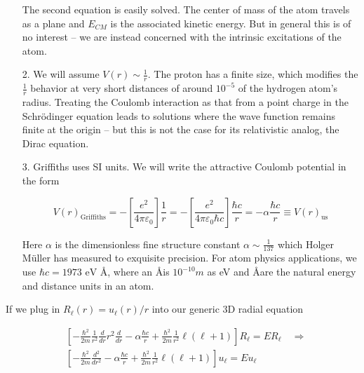 \begin{itemize}
    
    The second equation is easily solved. The center of mass of the atom
    travels as a plane and $E_{CM}$ is the associated kinetic energy. But in
    general this is of no interest -- we are instead concerned with the
    intrinsic excitations of the atom. 

  \item[2.] We will assume $V(r) \sim \frac{1}{r}$. The proton has a finite
    size, which modifies the $\frac{1}{r}$ behavior at very short distances of
    around $10^{-5}$ of the hydrogen atom's radius. Treating the Coulomb
    interaction as that from a point charge in the Schr\"odinger equation leads
    to solutions where the wave function remains finite at the origin -- but
    this is not the case for its relativistic analog, the Dirac equation. 

  \item[3.] Griffiths uses SI units. We will write the attractive Coulomb
    potential in the form 

    \[
      V(r)_\text{Griffiths} = -\left[ \frac{e^2}{4\pi\varepsilon_0}\right]
      \frac{1}{r} =-\left[ \frac{e^2}{4\pi\varepsilon_0\hbar c}\right]
      \frac{\hbar c}{r} = -\alpha \frac{\hbar c}{r} \equiv V(r)_\text{us}  
    \] \vspace{3px}
    
    
    Here $\alpha$ is the dimensionless fine structure constant $\alpha \sim
    \frac{1}{137}$ which Holger M\"uller has measured to exquisite precision.
    For atom physics applications, we use $\hbar c = 1973 \text{ eV \AA} $,
    where an \AA is $10^{-10} m$ as eV and \AA are the natural energy and
    distance units in an atom. 

\end{itemize}

    If we plug in $R_\ell (r) = u_\ell (r) / r$ into our generic 3D radial
    equation

    \begin{align} \label{}
      &\left[ -\frac{\hbar^2}{2m} \frac{1}{r^2} \frac{d }{d r} r^2 \frac{d }{d
        r} - \alpha \frac{\hbar c}{r} + \frac{\hbar^2}{2m} \frac{1}{r^2} \ell
        (\ell +1) \right] R_\ell = ER_\ell \quad \Rightarrow \\ 
      &\left[ -\frac{\hbar^2}{2m} \frac{d^2 }{d r^2} - \alpha \frac{\hbar c}{r}
      + \frac{\hbar^2}{2m}\frac{1}{r^2} \ell (\ell +1) \right] u_\ell
      = E u_\ell 
    \end{align}\vspace{3px}
 
